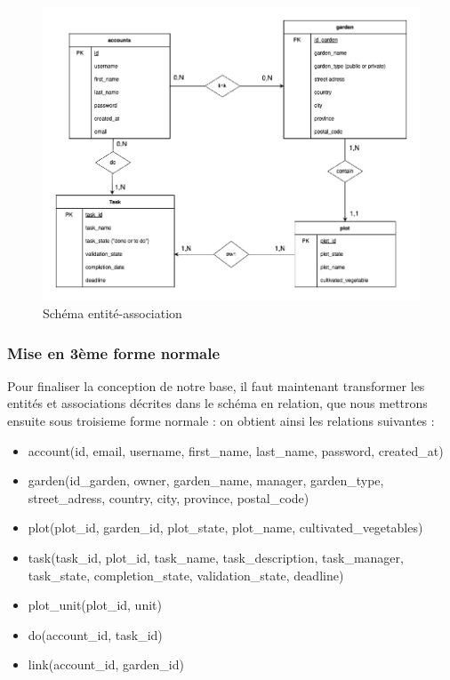 \documentclass[french,a4paper]{article}
\begin{document}
\begin{figure}[H]
    \centering
    \includegraphics[width=1\textwidth]{img/Schema_entite_association_PPIIversion2.drawio.png}
    \caption{Schéma entité-association}
\end{figure}

\subsubsection{Mise en 3ème forme normale}
Pour finaliser la conception de notre base, il faut maintenant transformer les entités et associations décrites dans le schéma en 
relation, que nous mettrons ensuite sous troisieme forme normale : on obtient ainsi les relations suivantes : 
\begin{itemize}
    \item account(id, email, username, first_name, last_name, password, created_at)
    \item garden(id_garden, owner, garden_name, manager, garden_type, street_adress, country, city, province, postal_code)
    \item plot(plot_id, garden_id, plot_state, plot_name, cultivated_vegetables)
    \item task(task_id, plot_id, task_name, task_description, task_manager, task_state, completion_state, validation_state, deadline)
    \item plot_unit(plot_id, unit)
    \item do(account_id, task_id)
    \item link(account_id, garden_id)
\end{itemize}
\end{document}
